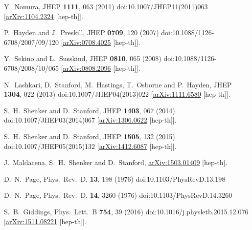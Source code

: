 \documentclass[a4paper,11pt]{article}
\theoremstyle{definition}
\begin{document}
\begin{thebibliography}{1}
  Y.~Nomura,
  JHEP {\bf 1111}, 063 (2011)
  doi:10.1007/JHEP11(2011)063
  [\href{https://arxiv.org/abs/1104.2324}{arXiv:1104.2324} [hep-th]].

  P.~Hayden and J.~Preskill,
  JHEP {\bf 0709}, 120 (2007)
  doi:10.1088/1126-6708/2007/09/120
  [\href{https://arxiv.org/abs/0708.4025}{arXiv:0708.4025} [hep-th]].
 

  Y.~Sekino and L.~Susskind,
  JHEP {\bf 0810}, 065 (2008)
  doi:10.1088/1126-6708/2008/10/065
  [\href{https://arxiv.org/abs/0808.2096}{arXiv:0808.2096} [hep-th]].


  N.~Lashkari, D.~Stanford, M.~Hastings, T.~Osborne and P.~Hayden,
  JHEP {\bf 1304}, 022 (2013)
  doi:10.1007/JHEP04(2013)022
  [\href{https://arxiv.org/abs/1111.6580}{arXiv:1111.6580} [hep-th]].


  S.~H.~Shenker and D.~Stanford,
  JHEP {\bf 1403}, 067 (2014)
  doi:10.1007/JHEP03(2014)067
  [\href{https://arxiv.org/abs/1306.0622}{arXiv:1306.0622} [hep-th]].

 
  S.~H.~Shenker and D.~Stanford,
  JHEP {\bf 1505}, 132 (2015)
  doi:10.1007/JHEP05(2015)132
  [\href{https://arxiv.org/abs/1412.6087}{arXiv:1412.6087} [hep-th]].

  
  J.~Maldacena, S.~H.~Shenker and D.~Stanford,
  \href{https://arxiv.org/abs/1503.01409}{arXiv:1503.01409} [hep-th].


  D.~N.~Page,
   Phys.\ Rev.\ D, {\bf 13}, 198 (1976)
   doi:10.1103/PhysRevD.13.198
   

  D.~N.~Page,
  Phys.\ Rev.\ D, {\bf 14}, 3260 (1976)
  doi:10.1103/PhysRevD.14.3260


  S.~B.~Giddings,
  Phys.\ Lett.\ B {\bf 754}, 39 (2016)
  doi:10.1016/j.physletb.2015.12.076
  [\href{https://arxiv.org/abs/1511.08221}{arXiv:1511.08221} [hep-th]].



\end{thebibliography}
\end{document}
